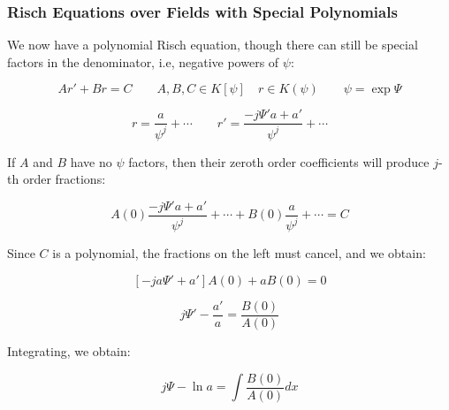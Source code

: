 \documentclass[aspectratio=169,dvipsnames]{beamer}
\begin{document}
\begin{frame}[fragile]
\frametitle{Risch Equations over Fields with Special Polynomials}
\tiny
We now have a polynomial Risch equation, though there can still be
special factors in the denominator, i.e, negative powers of $\psi$:

\begin{equation}
\label{eq: special polynomial Risch}
A r' + B r = C \qquad A,B,C \in K[\psi] \quad r \in K(\psi) \qquad \psi = \exp \Psi
\end{equation}

$$r = \frac{a}{\psi^j} + \cdots  \qquad  r' = \frac{-j \Psi' a + a'}{\psi^{j}} + \cdots$$

If $A$ and $B$ have no $\psi$ factors, then their zeroth order coefficients will produce $j$-th order fractions:

$$ A(0) \frac{-j \Psi' a + a'}{\psi^{j}} + \cdots
+ B(0) \frac{a}{\psi^j} + \cdots  = C$$

Since $C$ is a polynomial, the fractions on the left must cancel, and we obtain:

$$\left[ -ja \Psi' + a' \right] A(0) + a B(0) = 0$$

$$ j\Psi' - \frac{a'}{a }  = \frac{B(0)}{A(0)}$$

Integrating, we obtain:

\begin{equation}
\label{special risch equation - denominator bound}
j \Psi - \ln a = \int \frac{B(0)}{A(0)} dx
\end{equation}

\end{frame}
\end{document}
